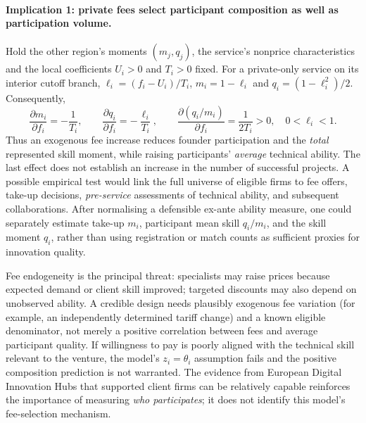 \paragraph{Implication 1: private fees select participant composition as well as participation volume.}
Hold the other region's moments $(m_j,q_j)$, the service's nonprice characteristics and the local coefficients $U_i>0$ and $T_i>0$ fixed. For a private-only service on its interior cutoff branch, $\ell_i=(f_i-U_i)/T_i$, $m_i=1-\ell_i$ and $q_i=(1-\ell_i^2)/2$. Consequently,
\begin{equation}
 \frac{\partial m_i}{\partial f_i}=-\frac1{T_i},\qquad
 \frac{\partial q_i}{\partial f_i}=-\frac{\ell_i}{T_i},\qquad
 \frac{\partial(q_i/m_i)}{\partial f_i}=\frac1{2T_i}>0,
 \quad 0<\ell_i<1.
 \label{eq:empirical-screen}
\end{equation}
Thus an exogenous fee increase reduces founder participation and the \emph{total} represented skill moment, while raising participants' \emph{average} technical ability. The last effect does not establish an increase in the number of successful projects. A possible empirical test would link the full universe of eligible firms to fee offers, take-up decisions, \emph{pre-service} assessments of technical ability, and subsequent collaborations. After normalising a defensible ex-ante ability measure, one could separately estimate take-up $m_i$, participant mean skill $q_i/m_i$, and the skill moment $q_i$, rather than using registration or match counts as sufficient proxies for innovation quality.

Fee endogeneity is the principal threat: specialists may raise prices because expected demand or client skill improved; targeted discounts may also depend on unobserved ability. A credible design needs plausibly exogenous fee variation (for example, an independently determined tariff change) and a known eligible denominator, not merely a positive correlation between fees and average participant quality. If willingness to pay is poorly aligned with the technical skill relevant to the venture, the model's $z_i=\theta_i$ assumption fails and the positive composition prediction is not warranted. The evidence from European Digital Innovation Hubs that supported client firms can be relatively capable \citep{CarpentierDAddaNepelski2026} reinforces the importance of measuring \emph{who participates}; it does not identify this model's fee-selection mechanism.


